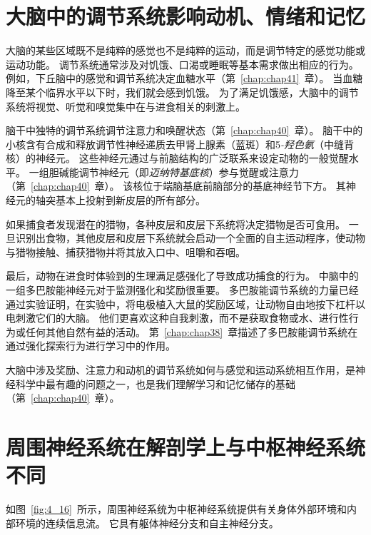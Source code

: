 \section{大脑中的调节系统影响动机、情绪和记忆}

大脑的某些区域既不是纯粹的感觉也不是纯粹的运动，而是调节特定的感觉功能或运动功能。
调节系统通常涉及对饥饿、口渴或睡眠等基本需求做出相应的行为。
例如，下丘脑中的感觉和调节系统决定血糖水平（第~\ref{chap:chap41}~章）。
当血糖降至某个临界水平以下时，我们就会感到饥饿。
为了满足饥饿感，大脑中的调节系统将视觉、听觉和嗅觉集中在与进食相关的刺激上。


脑干中独特的调节系统调节注意力和唤醒状态（第~\ref{chap:chap40}~章）。 
脑干中的小核含有合成和释放调节性神经递质去甲肾上腺素（蓝斑）和5\textit{-羟色氨}（中缝背核）的神经元。 
这些神经元通过与前脑结构的广泛联系来设定动物的一般觉醒水平。 
一组胆碱能调节神经元（即\textit{迈纳特基底核}）参与觉醒或注意力（第~\ref{chap:chap40}~章）。
该核位于端脑基底前脑部分的基底神经节下方。 
其神经元的轴突基本上投射到新皮层的所有部分。


如果捕食者发现潜在的猎物，各种皮层和皮层下系统将决定猎物是否可食用。 
一旦识别出食物，其他皮层和皮层下系统就会启动一个全面的自主运动程序，使动物与猎物接触、捕获猎物并将其放入口中、咀嚼和吞咽。


最后，动物在进食时体验到的生理满足感强化了导致成功捕食的行为。
中脑中的一组多巴胺能神经元对于监测强化和奖励很重要。 
多巴胺能调节系统的力量已经通过实验证明，在实验中，将电极植入大鼠的奖励区域，让动物自由地按下杠杆以电刺激它们的大脑。 
他们更喜欢这种自我刺激，而不是获取食物或水、进行性行为或任何其他自然有益的活动。 
第~\ref{chap:chap38}~章描述了多巴胺能调节系统在通过强化探索行为进行学习中的作用。


大脑中涉及奖励、注意力和动机的调节系统如何与感觉和运动系统相互作用，是神经科学中最有趣的问题之一，也是我们理解学习和记忆储存的基础（第~\ref{chap:chap40}~章）。



\section{周围神经系统在解剖学上与中枢神经系统不同}

如图~\ref{fig:4_16}~所示，周围神经系统为中枢神经系统提供有关身体外部环境和内部环境的连续信息流。
它具有躯体神经分支和自主神经分支。


